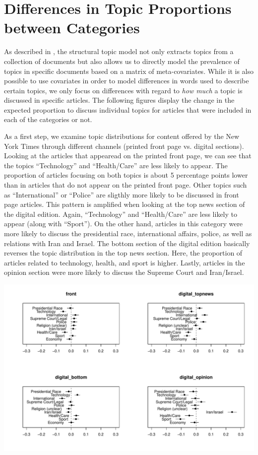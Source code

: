 \documentclass[12pt]{article}\usepackage[]{graphicx}\usepackage[]{color}
\makeatletter
\def\maxwidth{ %
  \ifdim\Gin@nat@width>\linewidth
    \linewidth
  \else
    \Gin@nat@width
  \fi
}
\newenvironment{knitrout}{}{} %
\makeatother
\begin{document}
\section{Differences in Topic Proportions between Categories}

As described in \citet{roberts2014structural}, the structural topic model not only extracts topics from a collection of documents but also allows us to directly model the prevalence of topics in specific documents based on a matrix of meta-covariates. While it is also possible to use covariates in order to model differences in words used to describe certain topics, we only focus on differences with regard to \textit{how much} a topic is discussed in specific articles. The following figures display the change in the expected proportion to discuss individual topics for articles that were included in each of the categories or not.

As a first step, we examine topic distributions for content offered by the New York Times through different channels (printed front page vs. digital sections). Looking at the articles that appearead on the printed front page, we can see that the topics ``Technology'' and ``Health/Care'' are less likely to appear. The proportion of articles focusing on both topics is about 5 percentage points lower than in articles that do not appear on the printed front page. Other topics such as ``International'' or ``Police'' are sligthly more likely to be discussed in front page articles. This pattern is amplified when looking at the top news section of the digital edition. Again, ``Technology'' and ``Health/Care'' are less likely to appear (along with ``Sport''). On the other hand, articles in this category were more likely to discuss the presidential race, international affairs, police, as well as relations with Iran and Israel. The bottom section of the digital edition basically reverses the topic distribution in the top news section. Here, the proportion of articles related to technology, health, and sport is higher. Lastly, articles in the opinion section were more likely to discuss the Supreme Court and Iran/Israel.


\begin{knitrout}
\color{fgcolor}
\includegraphics[width=\maxwidth]{figure/unnamed-chunk-7-1} 

\end{knitrout}
\end{document}

